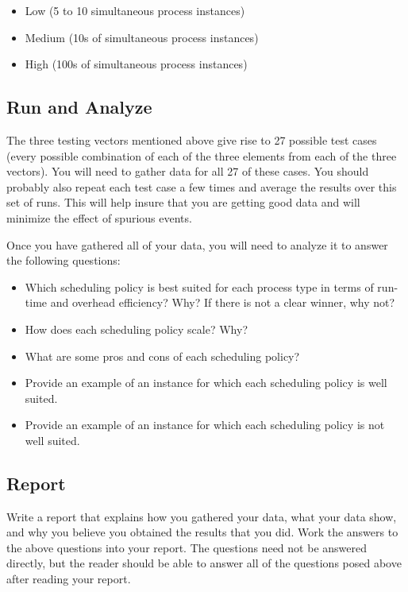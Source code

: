 \documentclass[12pt]{article}
\begin{document}
\begin{itemize}
\item Low (5 to 10 simultaneous process instances)
\item Medium (10s of simultaneous process instances)
\item High (100s of simultaneous process instances)
\end{itemize}

\subsection{Run and Analyze}

The three testing vectors mentioned above give rise to 27 possible
test cases (every possible combination of each of the three elements
from each of the three vectors). You will need to gather data for all
27 of these cases. You should probably also repeat each
test case a few times and average the results over this set
of runs. This will help insure that you are getting good data and
will minimize the effect of spurious events.

Once you have gathered all of your data, you will need to analyze it
to answer the following questions:

\begin{itemize}
\item Which scheduling policy is best suited for each process type in
  terms of run-time and overhead efficiency?
  Why? If there is not a clear winner, why not?
\item How does each scheduling policy scale? Why?
\item What are some pros and cons of each scheduling policy?
\item Provide an example of an instance for which each scheduling
  policy is well suited.
\item Provide an example of an instance for which each scheduling
  policy is not well suited.
\end{itemize}

\subsection{Report}

Write a report that explains how you gathered your data, what your
data show, and why you believe you obtained the results that you did. Work
the answers to the above questions into your report. The questions
need not be answered directly, but the reader should be able to answer
all of the questions posed above after reading your report.
\end{document}
